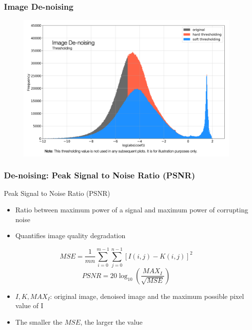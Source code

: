 \documentclass[aspectratio=169]{beamer}
\begin{document}
\begin{frame}
\frametitle{Image De-noising}
    \begin{figure}
        \centering
        \includegraphics[height=0.8\textheight, keepaspectratio]{thresholding_plot.png}
    \end{figure}
\end{frame}

\begin{frame}
\frametitle{De-noising: Peak Signal to Noise Ratio (PSNR)}
Peak Signal to Noise Ratio (PSNR)
\begin{itemize}
    \item Ratio between maximum power of a signal and maximum power of corrupting noise
    \item Quantifies image quality degradation
\end{itemize}
\begin{equation}
    MSE = \frac{1}{mn}\sum_{i=0}^{m-1}\sum_{j=0}^{n-1}[I(i,j) - K(i,j)]^2
\end{equation}
\begin{equation}
    PSNR = 20\log_{10}\left(\frac{MAX_I}{\sqrt{MSE}}\right)
\end{equation}
\begin{itemize}
    \item $I, K, MAX_I$: original image, denoised image and the maximum possible pixel value of I
    \item The smaller the $MSE$, the larger the value
\end{itemize}
\end{frame}
\end{document}
